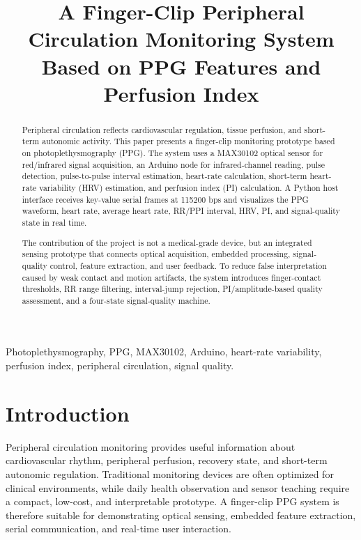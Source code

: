 \documentclass[10pt,conference]{IEEEtran}
\title{A Finger-Clip Peripheral Circulation Monitoring System Based on PPG Features and Perfusion Index}
\author{
\IEEEauthorblockN{Anonymous Authors}
\IEEEauthorblockA{Sensor Principles and Applications Project}
}
\begin{document}
\maketitle

\begin{abstract}
Peripheral circulation reflects cardiovascular regulation, tissue perfusion, and short-term autonomic activity. This paper presents a finger-clip monitoring prototype based on photoplethysmography (PPG). The system uses a MAX30102 optical sensor for red/infrared signal acquisition, an Arduino node for infrared-channel reading, pulse detection, pulse-to-pulse interval estimation, heart-rate calculation, short-term heart-rate variability (HRV) estimation, and perfusion index (PI) calculation. A Python host interface receives key-value serial frames at 115200 bps and visualizes the PPG waveform, heart rate, average heart rate, RR/PPI interval, HRV, PI, and signal-quality state in real time.

The contribution of the project is not a medical-grade device, but an integrated sensing prototype that connects optical acquisition, embedded processing, signal-quality control, feature extraction, and user feedback. To reduce false interpretation caused by weak contact and motion artifacts, the system introduces finger-contact thresholds, RR range filtering, interval-jump rejection, PI/amplitude-based quality assessment, and a four-state signal-quality machine.
\end{abstract}

\begin{IEEEkeywords}
Photoplethysmography, PPG, MAX30102, Arduino, heart-rate variability, perfusion index, peripheral circulation, signal quality.
\end{IEEEkeywords}

\section{Introduction}
Peripheral circulation monitoring provides useful information about cardiovascular rhythm, peripheral perfusion, recovery state, and short-term autonomic regulation. Traditional monitoring devices are often optimized for clinical environments, while daily health observation and sensor teaching require a compact, low-cost, and interpretable prototype. A finger-clip PPG system is therefore suitable for demonstrating optical sensing, embedded feature extraction, serial communication, and real-time user interaction.
\end{document}
